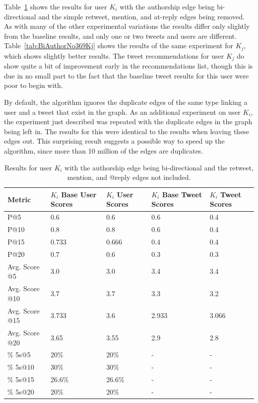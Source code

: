 Table~\ref{tab:BiAuthorNo369Ki} shows the results for user $K_{i}$ with the authorship edge being bi-directional and the simple retweet, mention, and at-reply edges being removed. As with many of the other experimental variations the results differ only slightly from the baseline results, and only one or two tweets and users are different. Table~\ref{tab:BiAuthorNo369Kj} shows the results of the same experiment for $K_{j}$, which shows slightly better results. The tweet recommendations for user $K_{j}$ do show quite a bit of improvement early in the recommendations list, though this is due in no small part to the fact that the baseline tweet results for this user were poor to begin with.

By default, the algorithm ignores the duplicate edges of the same type linking a user and a tweet that exist in the graph. As an additional experiment on user $K_{i}$, the experiment just described was repeated with the duplicate edges in the graph being left in. The results for this were identical to the results when leaving these edges out. This surprising result suggests a possible way to speed up the algorithm, since more than 10 million of the edges are duplicates.


\begin{table}
\centering
\begin{tabular}{l|p{2.2cm}|p{2.2cm}|p{2.2cm}|p{2.2cm}}
{\bf Metric} & {\bf $K_{i}$ Base User Scores} & {\bf $K_{i}$ User Scores} & {\bf $K_{i}$ Base Tweet Scores} & {\bf $K_{i}$ Tweet Scores} \\ \hline
P@5   & 0.6 & 0.6 & 0.6 & 0.4 \\ \hline
P@10 & 0.8 & 0.8 & 0.6 & 0.4 \\ \hline
P@15 & 0.733 & 0.666 & 0.4 & 0.4 \\ \hline
P@20 & 0.7 & 0.6 & 0.3 & 0.3 \\ \hline

Avg. Score @5   & 3.0 & 3.0 & 3.4 & 3.4 \\ \hline
Avg. Score @10 & 3.7 & 3.7 & 3.3 & 3.2 \\ \hline
Avg. Score @15 & 3.733 & 3.6 & 2.933 & 3.066 \\ \hline
Avg. Score @20 & 3.65 & 3.55 & 2.9 & 2.8 \\ \hline

\% 5s@5    & 20\% & 20\% & - & - \\ \hline
\% 5s@10  & 30\% & 30\% & - & - \\ \hline
\% 5s@15  & 26.6\% & 26.6\% & - & - \\ \hline
\% 5s@20  & 20\% & 20\% & - & - \\
\end{tabular}
\caption[Results for user $K_{i}$ using combined configuration 1]{Results for user $K_{i}$ with the authorship edge being bi-directional and the retweet, mention, and @reply edges not included.}
\label{tab:BiAuthorNo369Ki}
\end{table}


